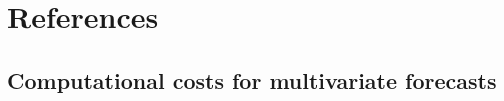 \documentclass[english, ieee]{tauthesis}
\begin{document}
\chapter{References}
\label{ch:references}
\printbibliography[heading=none]



\begin{appendices}

\chapter{Computational costs for multivariate forecasts}
\label{ch:latency_by_subset}


\label{ch:ram_by_sybset}


\end{appendices}
\end{document}
